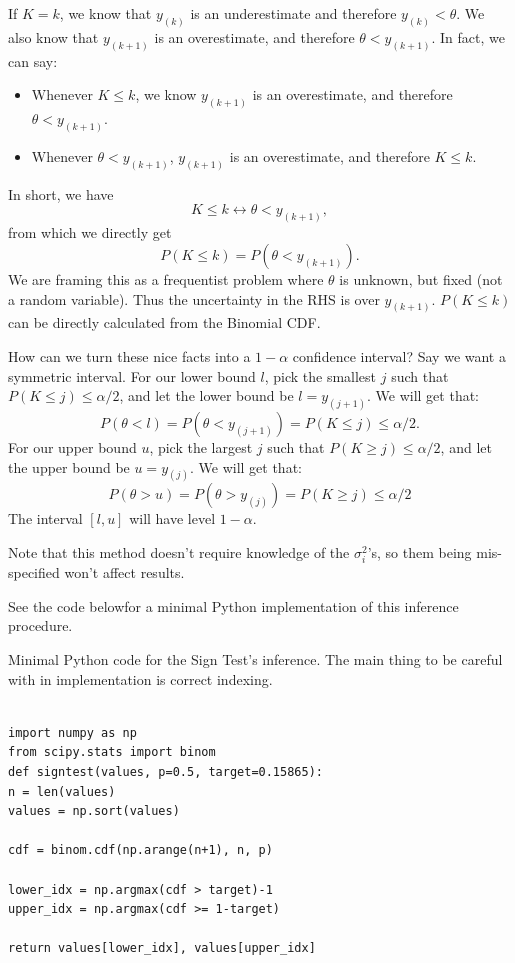 \documentclass[12pt]{article}
\begin{document}
If $K=k$, we know that $y_{(k)}$ is an underestimate and therefore $y_{(k)}< \theta$. We also know that $y_{(k+1)}$ is an overestimate, and therefore $\theta < y_{(k+1)}$. In fact, we can say:

\begin{itemize}
\item
  Whenever $K\leq k$, we know $y_{(k+1)}$ is an overestimate, and therefore $\theta<y_{(k+1)}$.
\item
  Whenever $\theta<y_{(k+1)}$, $y_{(k+1)}$ is an overestimate, and therefore $K\leq k$.
\end{itemize}

In short, we have
\begin{equation*}K\leq k\leftrightarrow \theta< y_{(k+1)},\end{equation*}
from which we directly get
\begin{equation*}P(K\leq k)=P(\theta<y_{(k+1)}).\end{equation*}
We are framing this as a frequentist problem where $\theta$ is unknown, but fixed (not a random variable). Thus the uncertainty in the RHS is over $y_{(k+1)}$. $P(K\leq k)$ can be directly calculated from the Binomial CDF.

How can we turn these nice facts into a $1-\alpha$ confidence interval? Say we want a symmetric interval. For our lower bound $l$, pick the smallest $j$ such that $P(K\leq j)\leq \alpha/2$, and let the lower bound be $l=y_{(j+1)}$. We will get that:
\begin{equation*}P(\theta<l)=P(\theta<y_{(j+1)})=P(K\leq j)\leq \alpha/2 .\end{equation*}
For our upper bound $u$, pick the largest $j$ such that $P(K\geq j)\leq \alpha/2$, and let the upper bound be $u=y_{(j)}$. We
will get that:
\begin{equation*}P(\theta>u)=P(\theta>y_{(j)})=P(K\geq j)\leq \alpha/2\end{equation*}
The interval $[l,u]$ will have level $1-\alpha$.

Note that this method doesn't require knowledge of the $\sigma_i^2$'s, so them being mis-specified won't affect results.

See the code belowfor a minimal Python implementation of this inference procedure.

\begin{listing}[h]
\caption{Minimal Python code for the Sign Test's inference. The main thing to be careful with in implementation is correct indexing.}
\smaller
\begin{verbatim}

import numpy as np
from scipy.stats import binom
def signtest(values, p=0.5, target=0.15865):
n = len(values)
values = np.sort(values)

cdf = binom.cdf(np.arange(n+1), n, p)

lower_idx = np.argmax(cdf > target)-1
upper_idx = np.argmax(cdf >= 1-target)

return values[lower_idx], values[upper_idx]
\end{verbatim}
\end{listing}
\end{document}
